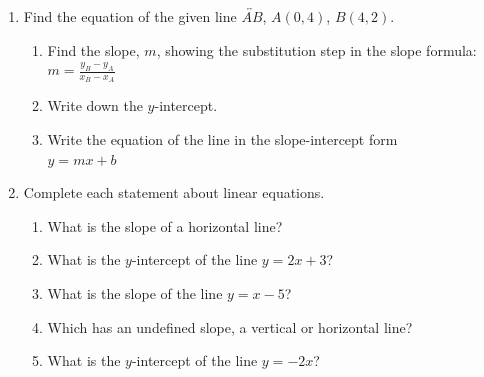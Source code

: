 \begin{enumerate}
\item Find the equation of the given line $\overleftrightarrow{AB}$, $A(0,4)$, $B(4,2)$.
\begin{multicols}{2}
    \begin{enumerate}[itemsep=1cm]
      \item Find the slope, $m$, showing the substitution step in the slope formula: \\[0.5cm]
      $\displaystyle m = \frac{y_B - y_A}{x_B - x_A}$\\[0.5cm]
      \item Write down the $y$-intercept.
      \item Write the equation of the line in the slope-intercept form\\[0.25cm]
      $y=mx+b$
      \end{enumerate}
    \begin{flushright}
    \end{flushright}
  \end{multicols}

\item Complete each statement about linear equations.
\begin{enumerate}[itemsep=0.5cm]
  \item What is the slope of a horizontal line?
  \item What is the $y$-intercept of the line $y = 2x + 3$?
  \item What is the slope of the line $y = x - 5$?
  \item Which has an undefined slope, a vertical or horizontal line?
  \item What is the $y$-intercept of the line $y = -2x$?
\end{enumerate}


\end{enumerate}
